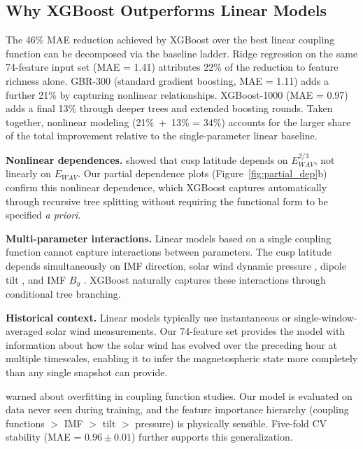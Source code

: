 \documentclass[draft]{agujournal2019}
\let\citet\citeA
\begin{document}
\subsection{Why XGBoost Outperforms Linear Models}

The 46\% MAE reduction achieved by XGBoost over the best linear coupling function can be decomposed via the baseline ladder. Ridge regression on the same 74-feature input set (MAE = 1.41\textdegree) attributes 22\% of the reduction to feature richness alone. GBR-300 (standard gradient boosting, MAE = 1.11\textdegree) adds a further 21\% by capturing nonlinear relationships. XGBoost-1000 (MAE = 0.97\textdegree) adds a final 13\% through deeper trees and extended boosting rounds. Taken together, nonlinear modeling (21\%~+~13\% = 34\%) accounts for the larger share of the total improvement relative to the single-parameter linear baseline.

\textbf{Nonlinear dependences.} \citet{newell2006cusp} showed that cusp latitude depends on $E_{WAV}^{2/3}$, not linearly on $E_{WAV}$. Our partial dependence plots (Figure~\ref{fig:partial_dep}b) confirm this nonlinear dependence, which XGBoost captures automatically through recursive tree splitting without requiring the functional form to be specified \textit{a priori}.

\textbf{Multi-parameter interactions.} Linear models based on a single coupling function cannot capture interactions between parameters. The cusp latitude depends simultaneously on IMF direction, solar wind dynamic pressure \cite{shue1997magnetopause, shue1998magnetopause}, dipole tilt \cite{newell1989tilt}, and IMF $B_y$ \cite{anderson2024cusp, cowley1981imfby}. XGBoost naturally captures these interactions through conditional tree branching.

\textbf{Historical context.} Linear models typically use instantaneous or single-window-averaged solar wind measurements. Our 74-feature set provides the model with information about how the solar wind has evolved over the preceding hour at multiple timescales, enabling it to infer the magnetospheric state more completely than any single snapshot can provide.

\citet{lockwood2022pitfalls} warned about overfitting in coupling function studies. Our model is evaluated on data never seen during training, and the feature importance hierarchy (coupling functions $>$ IMF $>$ tilt $>$ pressure) is physically sensible. Five-fold CV stability (MAE = $0.96 \pm 0.01$\textdegree) further supports this generalization.
\end{document}
